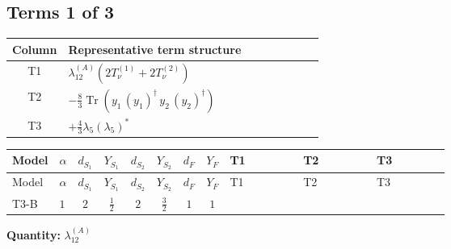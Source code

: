 \documentclass[8pt]{article}
\begin{document}
\begin{landscape}
\subsection*{Terms 1 of 3}
\begin{center}
\begin{tabular}{@{}c >{\raggedright\arraybackslash}p{0.82\linewidth}@{}}
\toprule
Column & Representative term structure \\
\midrule
T1 & \(\displaystyle {\lambda_{12}^{(A)}} (2 T_{\nu}^{(1)}+2 T_{\nu}^{(2)})\) \\
\midrule
T2 & \(\displaystyle -\frac{8}{3} \operatorname{Tr}\!\left({y_1}\,\left({y_1}\right)^{\dagger}\,{y_2}\,\left({y_2}\right)^{\dagger}\right)\) \\
\midrule
T3 & \(\displaystyle +\frac{4}{3} {\lambda_5} \left({\lambda_5}\right)^{*}\) \\
\midrule
\bottomrule
\end{tabular}
\end{center}
\smallskip
\tiny
\begin{longtable}{@{}llcccccc >{\raggedright\arraybackslash}p{0.21\linewidth} >{\raggedright\arraybackslash}p{0.21\linewidth} >{\raggedright\arraybackslash}p{0.21\linewidth}@{}}
\toprule
Model & $\alpha$ & $d_{S_1}$ & $Y_{S_1}$ & $d_{S_2}$ & $Y_{S_2}$ & $d_F$ & $Y_F$ & T1 & T2 & T3 \\
\midrule
\endfirsthead
\toprule
Model & $\alpha$ & $d_{S_1}$ & $Y_{S_1}$ & $d_{S_2}$ & $Y_{S_2}$ & $d_F$ & $Y_F$ & T1 & T2 & T3 \\
\midrule
\endhead
T3-B & $1$ & $2$ & $\frac{1}{2}$ & $2$ & $\frac{3}{2}$ & $1$ & $1$ & \scriptsize\adjustbox{max width=\linewidth}{$\begin{gathered} {\lambda_{12}^{(A)}} (2 T_{\nu}^{(1)}+2 T_{\nu}^{(2)})\end{gathered}$} & \scriptsize\adjustbox{max width=\linewidth}{$\begin{gathered} -\frac{8}{3} \operatorname{Tr}\!\left({y_1}\,\left({y_1}\right)^{\dagger}\,{y_2}\,\left({y_2}\right)^{\dagger}\right)\end{gathered}$} & \scriptsize\adjustbox{max width=\linewidth}{$\begin{gathered} +\frac{4}{3} {\lambda_5} \left({\lambda_5}\right)^{*}\end{gathered}$} \\
\midrule
\bottomrule
\end{longtable}
\clearpage
\noindent\textbf{Quantity: }$\lambda_{12}^{(A)}$\par\smallskip

\end{landscape}
\end{document}
